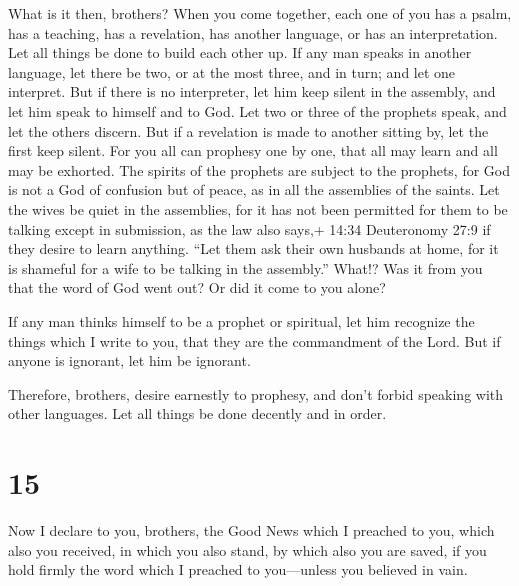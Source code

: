  What is it then, brothers? When you come together, each
one of you has a psalm, has a teaching, has a revelation, has another
language, or has an interpretation. Let all things be done to build each
other up.  If any man speaks in another language, let there
be two, or at the most three, and in turn; and let one interpret.
 But if there is no interpreter, let him keep silent in the
assembly, and let him speak to himself and to God.  Let two
or three of the prophets speak, and let the others discern.
 But if a revelation is made to another sitting by, let the
first keep silent.  For you all can prophesy one by one,
that all may learn and all may be exhorted.  The spirits of
the prophets are subject to the prophets,  for God is not a
God of confusion but of peace, as in all the assemblies of the saints.
 Let the wives be quiet in the assemblies, for it has not
been permitted for them to be talking except in submission, as the law
also says,+ 14:34 Deuteronomy 27:9  if they desire to learn
anything. ``Let them ask their own husbands at home, for it is shameful
for a wife to be talking in the assembly.''  What!? Was it
from you that the word of God went out? Or did it come to you alone?

 If any man thinks himself to be a prophet or spiritual,
let him recognize the things which I write to you, that they are the
commandment of the Lord.  But if anyone is ignorant, let
him be ignorant.

 Therefore, brothers, desire earnestly to prophesy, and
don't forbid speaking with other languages.  Let all things
be done decently and in order.

\hypertarget{section-14}{%
\section{15}\label{section-14}}

 Now I declare to you, brothers, the Good News which I
preached to you, which also you received, in which you also stand,
 by which also you are saved, if you hold firmly the word
which I preached to you---unless you believed in vain.

